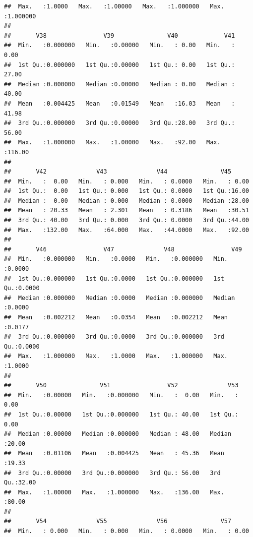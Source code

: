 \documentclass[
]{article}
\begin{document}
\begin{verbatim}
##  Max.   :1.0000   Max.   :1.00000   Max.   :1.000000   Max.   :1.000000  
##                                                                          
##       V38                V39               V40             V41        
##  Min.   :0.000000   Min.   :0.00000   Min.   : 0.00   Min.   :  0.00  
##  1st Qu.:0.000000   1st Qu.:0.00000   1st Qu.: 0.00   1st Qu.: 27.00  
##  Median :0.000000   Median :0.00000   Median : 0.00   Median : 40.00  
##  Mean   :0.004425   Mean   :0.01549   Mean   :16.03   Mean   : 41.98  
##  3rd Qu.:0.000000   3rd Qu.:0.00000   3rd Qu.:28.00   3rd Qu.: 56.00  
##  Max.   :1.000000   Max.   :1.00000   Max.   :92.00   Max.   :116.00  
##                                                                       
##       V42              V43              V44               V45       
##  Min.   :  0.00   Min.   : 0.000   Min.   : 0.0000   Min.   : 0.00  
##  1st Qu.:  0.00   1st Qu.: 0.000   1st Qu.: 0.0000   1st Qu.:16.00  
##  Median :  0.00   Median : 0.000   Median : 0.0000   Median :28.00  
##  Mean   : 20.33   Mean   : 2.301   Mean   : 0.3186   Mean   :30.51  
##  3rd Qu.: 40.00   3rd Qu.: 0.000   3rd Qu.: 0.0000   3rd Qu.:44.00  
##  Max.   :132.00   Max.   :64.000   Max.   :44.0000   Max.   :92.00  
##                                                                     
##       V46                V47              V48                V49        
##  Min.   :0.000000   Min.   :0.0000   Min.   :0.000000   Min.   :0.0000  
##  1st Qu.:0.000000   1st Qu.:0.0000   1st Qu.:0.000000   1st Qu.:0.0000  
##  Median :0.000000   Median :0.0000   Median :0.000000   Median :0.0000  
##  Mean   :0.002212   Mean   :0.0354   Mean   :0.002212   Mean   :0.0177  
##  3rd Qu.:0.000000   3rd Qu.:0.0000   3rd Qu.:0.000000   3rd Qu.:0.0000  
##  Max.   :1.000000   Max.   :1.0000   Max.   :1.000000   Max.   :1.0000  
##                                                                         
##       V50               V51                V52              V53       
##  Min.   :0.00000   Min.   :0.000000   Min.   :  0.00   Min.   : 0.00  
##  1st Qu.:0.00000   1st Qu.:0.000000   1st Qu.: 40.00   1st Qu.: 0.00  
##  Median :0.00000   Median :0.000000   Median : 48.00   Median :20.00  
##  Mean   :0.01106   Mean   :0.004425   Mean   : 45.36   Mean   :19.33  
##  3rd Qu.:0.00000   3rd Qu.:0.000000   3rd Qu.: 56.00   3rd Qu.:32.00  
##  Max.   :1.00000   Max.   :1.000000   Max.   :136.00   Max.   :80.00  
##                                                                       
##       V54              V55              V56               V57       
##  Min.   : 0.000   Min.   : 0.000   Min.   : 0.0000   Min.   : 0.00  

\end{verbatim}
\end{document}
